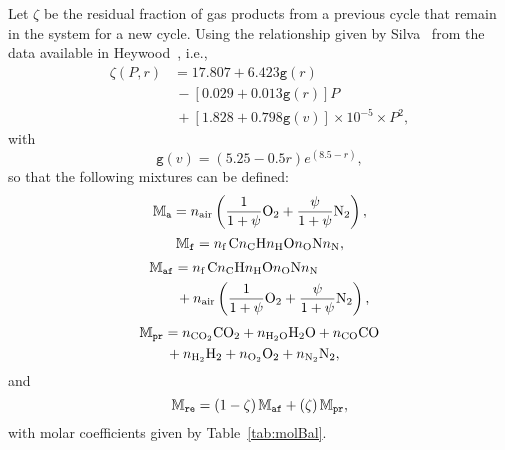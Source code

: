     Let $\zeta$ be the residual fraction of gas products from a previous cycle that remain in the system for a new cycle. Using the relationship given by Silva~\cite{2018-SilvaRKO-UTFPR}  from
    the data available in Heywood~\cite{1988-HeywoodJB-McGrawHill}, i.e.,%
    \begin{align}
        \zeta(P, r) &= 17.807 + 6.423\mathtt{g}(r) \nonumber\\
                    &\,- [0.029 + 0.013\mathtt{g}(r)] P \nonumber\\
                    &\,+ [1.828 + 0.798\mathtt{g}(v)] \times 10^{-5} \times P^2,
        \label{eq:zeta}
    \end{align}
    \noindent with%
    \begin{equation}
        \mathtt{g}(v) = (5.25 - 0.5r) e^{(8.5 - r)},
        \label{eq:zeta.g}
    \end{equation}
    \noindent so that the following mixtures can be defined:%
    \begin{equation}
        \label{eq:MXAIR}
        \MXAIR  =   \NA\left(
                        \frac{1}{1+\psi}\mbox{\ce{O2}} +
                        \frac{\psi}{1+\psi}\mbox{\ce{N2}}
                    \right),
    \end{equation}
    \begin{equation}
        \label{eq:MXFUE}
        \MXFUE  =   \NF\,\mbox{\ce{C\NC H\NH O\NO N\NN}},
    \end{equation}
    \begin{align}
        \label{eq:MXAFU}
        \MXAFU  &=  \NF\,\mbox{\ce{C\NC H\NH O\NO N\NN}} \nonumber\\
                &\,+\NA\left(
                        \frac{1}{1+\psi}\mbox{\ce{O2}} +
                        \frac{\psi}{1+\psi}\mbox{\ce{N2}}
                    \right),
    \end{align}
    \begin{align}
        \label{eq:MXPRO}
        \MXPRO  &=  \NCOO\mbox{\ce{CO2}} +
                    \NHHO\mbox{\ce{H2O}} +
                    \NCO\mbox{\ce{CO}} \nonumber\\
                &\,+\NHH\mbox{\ce{H2}} +
                    \NOO\mbox{\ce{O2}} +
                    \NNN\mbox{\ce{N2}},
    \end{align}
    \noindent and%
    \begin{equation}
        \label{eq:MXREA}
        \mathbb{M}_{\mbox{\scriptsize\tt re}}  =   (1 - \zeta)\,\mathbb{M}_{\mbox{\scriptsize\tt af}} + (\zeta)\,\mathbb{M}_{\mbox{\scriptsize\tt pr}},
    \end{equation}
    \noindent with molar coefficients given by Table~\ref{tab:molBal}.

